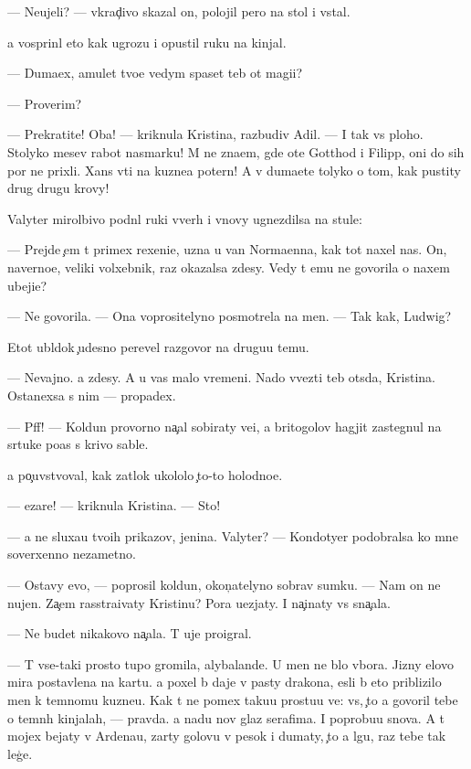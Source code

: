 \documentclass[10pt]{book}
\begin{document}
— Neujeli? — vkrad{\c}ivo skazal on, polojil pero na stol i vstal.

{\Y}a vosprin{\ia}l eto kak ugrozu i opustil ruku na kinjal.

— Duma{\y}ex, amulet tvo{\y}e{\y} vedym{\yi} spaset teb{\ia} ot magi{\y}i?

— Proverim?

— Prekratite! Oba! — kriknula Kristina, razbudiv Adil{\ia}. — I tak vs{\e} ploho. Stolyko mes{\ia}{\q}ev rabot{\yi} nasmarku! M{\yi} ne zna{\y}em, gde ote{\q} Gotthod i Filipp, oni do sih por ne prixli. Xans v{\yi}{\y}ti na kuzne{\q}a poter{\ia}n! A v{\yi} duma{\y}ete tolyko o tom, kak pustity drug drugu krovy!

Valyter mirol{\iu}bivo podn{\ia}l ruki vverh i vnovy ugnezdilsa na stule:

— Prejde {\c}em t{\yi} primex rexeni{\y}e, uzna{\y} u van Norma{\y}enna, kak tot naxel nas. On, naverno{\y}e, veliki{\y} volxebnik, raz okazalsa zdesy. Vedy t{\yi} {\y}emu ne govorila o naxem ubeji{\x}e?

— Ne govorila. — Ona voprositelyno posmotrela na men{\ia}. — Tak kak, Ludwig?

Etot ubl{\iu}dok {\c}udesno perevel razgovor na drugu{\y}u temu.

— Nevajno. {\Y}a zdesy. A u vas malo vremeni. Nado v{\yi}vezti teb{\ia} ots{\iu}da, Kristina. Ostanexsa s nim — propadex.

— Pff! — Koldun provorno na{\c}al sobiraty ve{\x}i, a britogolov{\yi}{\y} hagjit zastegnul na s{\iu}rtuke po{\y}as s krivo{\y} sable{\y}.

{\Y}a po{\c}uvstvoval, kak zat{\yi}lok ukololo {\c}to-to holodno{\y}e.

— {\C}ezare! — kriknula Kristina. — Sto{\y}!

— {\Y}a ne sluxa{\y}u tvo{\y}ih prikazov, jen{\x}ina. Valyter? — Kondotyer podobralsa ko mne soverxenno nezametno.

— Ostavy {\y}evo, — poprosil koldun, okon{\c}atelyno sobrav sumku. — Nam on ne nujen. Za{\c}em rasstra{\y}ivaty Kristinu? Pora u{\y}ezjaty. I na{\c}inaty vs{\e} sna{\c}ala.

— Ne budet nikakovo na{\c}ala. T{\yi} uje pro{\y}igral.

— T{\yi} vse-taki prosto tupo{\y} gromila, alybalande{\q}. U men{\ia} ne b{\yi}lo v{\yi}bora. Jizny {\q}elovo mira postavlena na kartu. {\Y}a poxel b{\yi} daje v pasty drakona, {\y}esli b{\yi} eto priblizilo men{\ia} k temnomu kuzne{\q}u. Kak t{\yi} ne po{\y}mex taku{\y}u prostu{\y}u ve{\x}: vs{\e}, {\c}to {\y}a govoril tebe o temn{\yi}h kinjalah, — pravda. {\Y}a na{\y}du nov{\yi}{\y} glaz serafima. I poprobu{\y}u snova. A t{\yi} mojex bejaty v Ardenau, zar{\yi}ty golovu v pesok i dumaty, {\c}to {\y}a lgu, raz tebe tak leg{\c}e.
\end{document}
